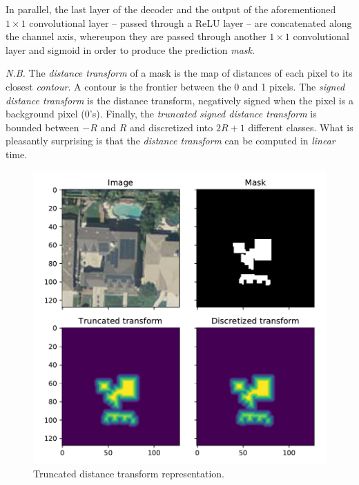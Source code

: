 \documentclass[twocolumn,superscriptaddress,aps,nofootinbib]{revtex4-1}
\begin{document}
In parallel, the last layer of the decoder and the output of the aforementioned $1 \times 1$ convolutional layer -- passed through a ReLU layer -- are concatenated along the channel axis, whereupon they are passed through another $1 \times 1$ convolutional layer and sigmoid in order to produce the prediction \emph{mask}.

\emph{N.B.} The \emph{distance transform} of a mask is the map of distances of each pixel to its closest \emph{contour}. A contour is the frontier between the \num{0} and \num{1} pixels. The \emph{signed distance transform} is the distance transform, negatively signed when the pixel is a background pixel (\num{0}'s). Finally, the \emph{truncated signed distance transform} is bounded between $-R$ and $R$ and discretized into $2R + 1$ different classes. What is pleasantly surprising is that the \emph{distance transform} can be computed in \emph{linear} time.

\begin{figure}[h]
    \centering
    \vspace{-1em}
    \includegraphics[width=\columnwidth]{resources/pdf/distance_transform.pdf}
    \vspace{-2em}
    \caption{Truncated distance transform representation.}
    \vspace{-0.5em}
    \label{fig:distance_transform}
\end{figure}
\end{document}
